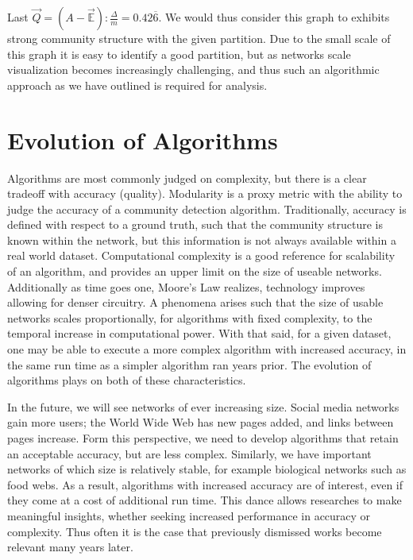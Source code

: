 \documentclass[a4paper, 10pt, twocolumn]{article}
\begin{document}
\noindent
Last $ \vec{Q} = (A - \vec{\mathbb{E}}) : \frac{\varDelta}{m} = 0.42 \overline{6} $.
We would thus consider this graph to exhibits strong community structure with the given partition. 
Due to the small scale of this graph it is easy to identify a good partition, but as networks scale visualization becomes increasingly challenging, and thus such an algorithmic approach as we have outlined is required for analysis. 


\section{Evolution of Algorithms}

Algorithms are most commonly judged on complexity, but there is a clear tradeoff with accuracy (quality). 
Modularity is a proxy metric with the ability to judge the accuracy of a community detection algorithm. 
Traditionally, accuracy is defined with respect to a ground truth, such that the community structure is known within the network, but this information is not always available within a real world dataset. 
Computational complexity is a good reference for scalability of an algorithm, and provides an upper limit on the size of useable networks. 
Additionally as time goes one, Moore's Law realizes, technology improves allowing for denser circuitry. 
A phenomena arises such that the size of usable networks scales proportionally, for algorithms with fixed complexity, to the temporal increase in computational power. 
With that said, for a given dataset, one may be able to execute a more complex algorithm with increased accuracy, in the same run time as a simpler algorithm ran years prior. 
The evolution of algorithms plays on both of these characteristics. 

In the future, we will see networks of ever increasing size. 
Social media networks gain more users; the World Wide Web has new pages added, and links between pages increase. 
Form this perspective, we need to develop algorithms that retain an acceptable accuracy, but are less complex. 
Similarly, we have important networks of which size is relatively stable, for example biological networks such as food webs. 
As a result, algorithms with increased accuracy are of interest, even if they come at a cost of additional run time. 
This dance allows researches to make meaningful insights, whether seeking increased performance in accuracy or complexity. 
Thus often it is the case that previously dismissed works become relevant many years later.  
\end{document}
